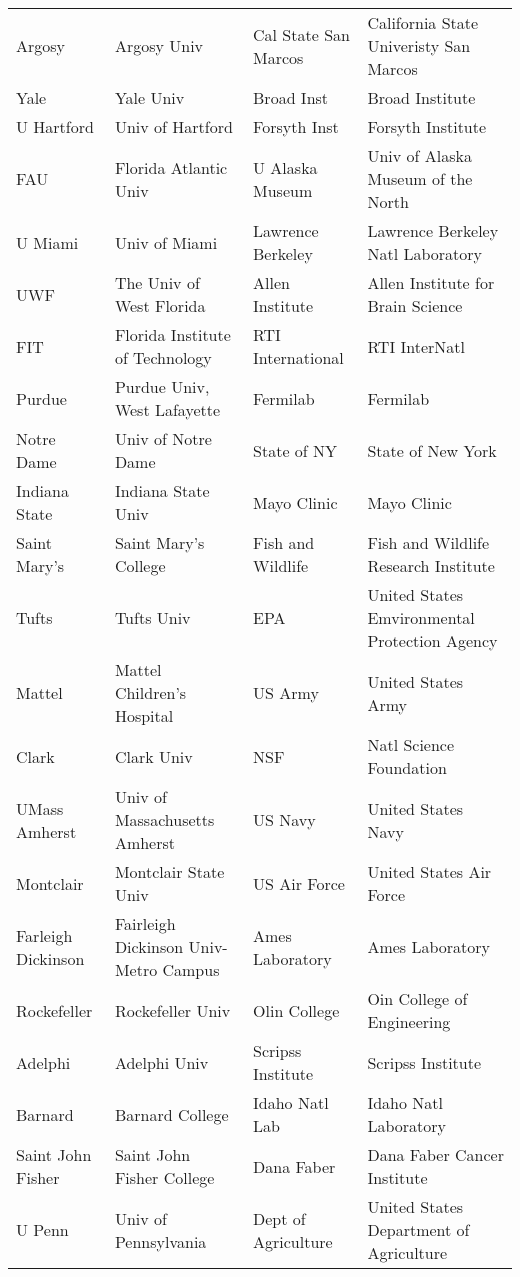 \documentclass[12pt]{article} %
\begin{document}
\begin{table}[ht]
\begin{adjustwidth}{-2cm}{}
\begin{tabular}{llll}
  Argosy & Argosy Univ & Cal State San Marcos & California State Univeristy San Marcos \\ 
  Yale & Yale Univ & Broad Inst & Broad Institute \\ 
  U Hartford & Univ of Hartford & Forsyth Inst & Forsyth Institute \\ 
  FAU & Florida Atlantic Univ & U Alaska Museum & Univ of Alaska Museum of the North \\ 
  U Miami & Univ of Miami & Lawrence Berkeley & Lawrence Berkeley Natl Laboratory \\ 
  UWF & The Univ of West Florida & Allen Institute & Allen Institute for Brain Science \\ 
  FIT & Florida Institute of Technology & RTI International & RTI InterNatl \\ 
  Purdue & Purdue Univ, West Lafayette & Fermilab & Fermilab \\ 
  Notre Dame & Univ of Notre Dame & State of NY & State of New York \\ 
  Indiana State & Indiana State Univ & Mayo Clinic & Mayo Clinic \\ 
  Saint Mary's & Saint Mary's College & Fish and Wildlife & Fish and Wildlife Research Institute \\ 
  Tufts & Tufts Univ & EPA & United States Emvironmental Protection Agency \\ 
  Mattel & Mattel Children's Hospital & US Army & United States Army \\ 
  Clark & Clark Univ & NSF & Natl Science Foundation \\ 
  UMass Amherst & Univ of Massachusetts Amherst & US Navy & United States Navy \\ 
  Montclair & Montclair State Univ & US Air Force & United States Air Force \\ 
  Farleigh Dickinson & Fairleigh Dickinson Univ-Metro Campus & Ames Laboratory & Ames Laboratory \\ 
  Rockefeller & Rockefeller Univ & Olin College & Oin College of Engineering \\ 
  Adelphi & Adelphi Univ & Scripss Institute & Scripss Institute \\ 
  Barnard & Barnard College & Idaho Natl Lab & Idaho Natl Laboratory \\ 
  Saint John Fisher & Saint John Fisher College & Dana Faber & Dana Faber Cancer Institute \\ 
  U Penn & Univ of Pennsylvania & Dept of Agriculture & United States Department of Agriculture \\ 

\end{tabular}
\end{adjustwidth}
\end{table}
\end{document}
